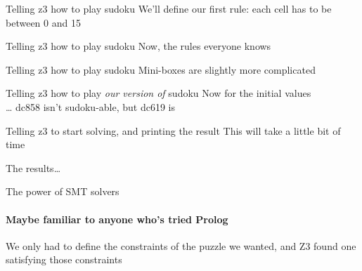 \begin{frame}{Telling z3 how to play sudoku}
    We'll define our first rule: each cell has to be between 0 and 15 \pause \\

\end{frame}

\begin{frame}{Telling z3 how to play sudoku}
    Now, the rules everyone knows \pause \\

\end{frame}

\begin{frame}{Telling z3 how to play sudoku}
    Mini-boxes are slightly more complicated \pause \\

\end{frame}

\begin{frame}{Telling z3 how to play {\em our version of} sudoku}
    Now for the initial values \\
    \ldots\xspace dc858 isn't sudoku-able, but dc619 is \pause \\

\end{frame}

\begin{frame}{Telling z3 to start solving, and printing the result}
    This will take a little bit of time \pause \\

\end{frame}

\begin{frame}{The results\ldots}
    \begin{center}
    \end{center}
\end{frame}

\begin{frame}{The power of SMT solvers}
    \framesubtitle{Maybe familiar to anyone who's tried Prolog}
    \begin{center}
        {\Large
            We only had to \alert{define the constraints of the puzzle we
            wanted}, and Z3 found one satisfying those constraints
        }
    \end{center}
\end{frame}

